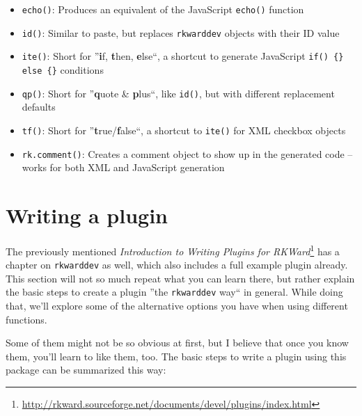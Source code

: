 \documentclass[a4paper,10pt]{scrartcl}
\begin{document}
\begin{itemize}
	\item  \texttt{echo()}: Produces an equivalent of the JavaScript \texttt{echo()} function
	\item  \texttt{id()}: Similar to paste, but replaces \texttt{rkwarddev} objects with their ID value
	\item  \texttt{ite()}: Short for ''\textbf{i}f, \textbf{t}hen, \textbf{e}lse``, a shortcut to generate JavaScript \texttt{if() \{\} else \{\}} conditions
	\item  \texttt{qp()}: Short for ''\textbf{q}uote \& \textbf{p}lus``, like \texttt{id()}, but with different replacement defaults
	\item  \texttt{tf()}: Short for ''\textbf{t}rue/\textbf{f}alse``, a shortcut to \texttt{ite()} for XML checkbox objects
	\item  \texttt{rk.comment()}: Creates a comment object to show up in the generated code -- works for both XML and JavaScript generation
\end{itemize}


\section{Writing a plugin}
The previously mentioned \textit{Introduction to Writing Plugins for RKWard}\footnote{\url{http://rkward.sourceforge.net/documents/devel/plugins/index.html}}
has a chapter on \texttt{rkwarddev} as well, which also includes a full example plugin already. This section will not so much repeat what you can learn there,
but rather explain the basic steps to create a plugin ''the \texttt{rkwarddev} way`` in general. While doing that, we'll explore some of the alternative options
you have when using different functions.

Some of them might not be so obvious at first, but I believe that once you know them, you'll learn to like them, too. The basic steps to write a plugin using this
package can be summarized this way:
\end{document}
